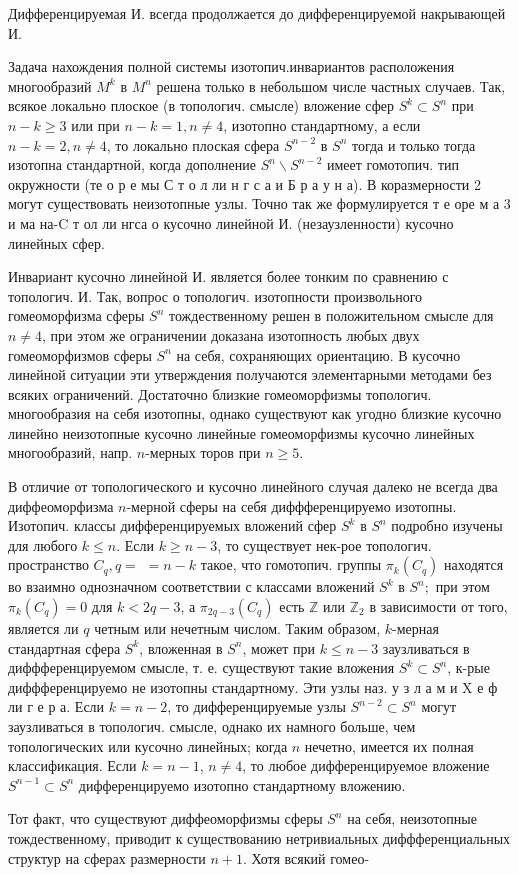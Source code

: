 \documentclass[10pt]{article}
\begin{document}
Дифференцируемая И. всегда продолжается до дифференцируемой накрывающей И.



Задача нахождения полной системы изотопич.инвариантов расположения многообразий $M^{k}$ в $M^{n}$ решена только в небольшом числе частных случаев. Так, всякое локально плоское (в топологич. смысле) вложение сфер $S^{k} \subset S^{n}$ при $n-k \geqslant 3$ или при $n-k=1, n \neq 4$, изотопно стандартному, а если $n-k=2, n \neq 4$, то локально плоская сфера $S^{n-2}$ в $S^{n}$ тогда и только тогда изотопна стандартной, когда дополнение $S^{n} \backslash S^{n-2}$ имеет гомотопич. тип окружности (те о р е мы С т о л ли н г с а и Б р а у н а). В коразмерности 2 могут существовать неизотопные узлы. Точно так же формулируется т е оре м а 3 и ма на-C т ол ли нгса о кусочно линейной И. (незаузленности) кусочно линейных сфер.



Инвариант кусочно линейной И. является более тонким по сравнению с топологич. И. Так, вопрос о топологич. изотопности произвольного гомеоморфизма сферы $S^{n}$ тождественному решен в положительном смысле для $n \neq 4$, при этом же ограничении доказана изотопность любых двух гомеоморфизмов сферы $S^{n}$ на себя, сохраняющих ориентацию. В кусочно линейной ситуации эти утверждения получаются элементарными методами без всяких ограничений. Достаточно близкие гомеоморфизмы топологич. многообразия на себя изотопны, однако существуют как угодно близкие кусочно линейно неизотопные кусочно линейные гомеоморфизмы кусочно линейных многообразий, напр. $n$-мерных торов при $n \geqslant 5$.



В отличие от топологического и кусочно линейного случая далеко не всегда два диффеоморфизма $n$-мерной сферы на себя диффференцируемо изотопны. Изотопич. классы дифференцируемых вложений сфер $S^{k}$ в $S^{n}$ подробно изучены для любого $k \leqslant n$. Если $k \geqslant n-3$, то существует нек-рое топологич. пространство $C_{q}, q=$ $=n-k$ такое, что гомотопич. группы $\pi_{k}\left(C_{q}\right)$ находятся во взаимно однозначном соответствии с классами вложений $S^{k}$ в $S^{n} ;$ при этом $\pi_{k}\left(C_{q}\right)=0$ для $k<2 q-3$, а $\pi_{2 q-3}\left(C_{q}\right)$ есть $\mathbb{Z}$ или $\mathbb{Z}_{2}$ в зависимости от того, является ли $q$ четным или нечетным числом. Таким образом, $k$-мерная стандартная сфера $S^{k}$, вложенная в $S^{n}$, может при $k \leqslant n-3$ заузливаться в диффференцируемом смысле, т. е. существуют такие вложения $S^{k} \subset S^{n}$, к-рые диффференцируемо не изотопны стандартному. Эти узлы наз. у з л а м и $\mathrm{X}$ е ф ли г е р а. Если $k=n-2$, то дифференцируемые узлы $S^{n-2} \subset S^{n}$ могут заузливаться в топологич. смысле, однако их намного больше, чем топологических или кусочно линейных; когда $n$ нечетно, имеется их полная классификация. Если $k=n-1$, $n \neq 4$, то любое дифференцируемое вложение $S^{n-1} \subset S^{n}$ дифференцируемо изотопно стандартному вложению.



Тот факт, что существуют диффеоморфизмы сферы $S^{n}$ на себя, неизотопные тождественному, приводит к существованию нетривиальных диффференциальных структур на сферах размерности $n+1$. Хотя всякий гомео-
\end{document}
